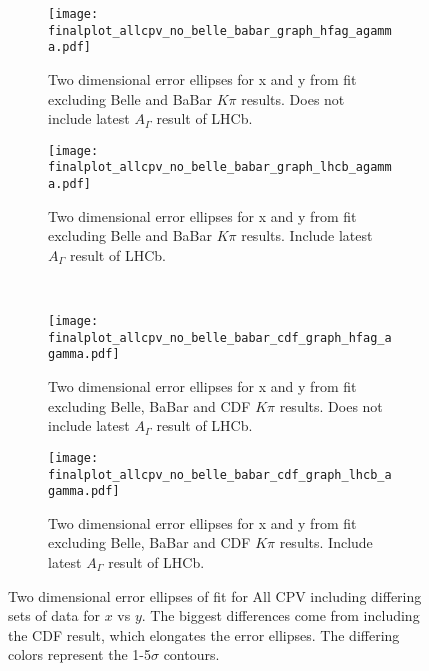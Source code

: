 
\begin{figure}[htb]
  \begin{center}
    \begin{subfigure}[b]{0.4\textwidth}
      \centering
      \texttt{[image: finalplot\_allcpv\_no\_belle\_babar\_graph\_hfag\_agamma.pdf]}
      \caption{Two dimensional error ellipses for x and y from fit excluding Belle and BaBar $K\pi$ results. Does not include latest $A_\Gamma$ result of LHCb.}
      \label{fig:xy_all_cpv_no_agamma}
    \end{subfigure}%
    \hspace{2mm}
    \begin{subfigure}[b]{0.4\textwidth}
      \centering
      \texttt{[image: finalplot\_allcpv\_no\_belle\_babar\_graph\_lhcb\_agamma.pdf]}
      \caption{Two dimensional error ellipses for x and y from fit excluding Belle and BaBar $K\pi$ results. Include latest $A_\Gamma$ result of LHCb.}
      \label{fig:xy_all_cpv_with_agamma}
    \end{subfigure}%
    \\
    
    \begin{subfigure}[b]{0.4\textwidth}
      \centering
      \texttt{[image: finalplot\_allcpv\_no\_belle\_babar\_cdf\_graph\_hfag\_agamma.pdf]}
      \caption{Two dimensional error ellipses for x and y from fit excluding Belle, BaBar and CDF $K\pi$ results. Does not include latest $A_\Gamma$ result of LHCb.}
      \label{fig:xy_all_cpv_no_agamma}
    \end{subfigure}%
    \hspace{2mm}
    \begin{subfigure}[b]{0.4\textwidth}
      \centering
      \texttt{[image: finalplot\_allcpv\_no\_belle\_babar\_cdf\_graph\_lhcb\_agamma.pdf]}
      \caption{Two dimensional error ellipses for x and y from fit excluding Belle, BaBar and CDF $K\pi$ results. Include latest $A_\Gamma$ result of LHCb.}
      \label{fig:xy_all_cpv_with_agamma}
    \end{subfigure}%
  \end{center}
  \caption{Two dimensional error ellipses of fit for All CPV including differing sets of data for $x$ vs $y$. The biggest differences come from including the CDF result, which elongates the error ellipses. The differing colors represent the 1-5$\sigma$ contours.}
  \label{fig:xy_all_variations}
\end{figure}

